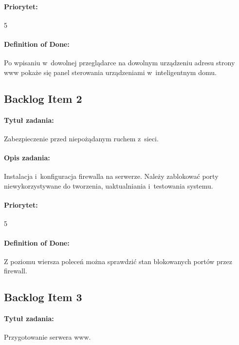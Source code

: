 	\paragraph{Priorytet:}
	5
	
	\paragraph{Definition of Done:}
	Po wpisaniu w~dowolnej przeglądarce na dowolnym urządzeniu adresu strony www pokaże się panel sterowania urządzeniami w~inteligentnym domu.
	

\subsection{Backlog Item 2}
\paragraph{Tytuł zadania:}
Zabezpieczenie przed niepożądanym ruchem z~sieci.

\paragraph{Opis zadania:}
Instalacja i~konfiguracja firewalla na serwerze. Należy zablokować porty niewykorzystywane do tworzenia, uaktualniania i~testowania systemu.

\paragraph{Priorytet:}
5

\paragraph{Definition of Done:}
Z poziomu wiersza poleceń można sprawdzić stan blokowanych portów przez firewall.


\subsection{Backlog Item 3}
\paragraph{Tytuł zadania:}
Przygotowanie serwera www.

